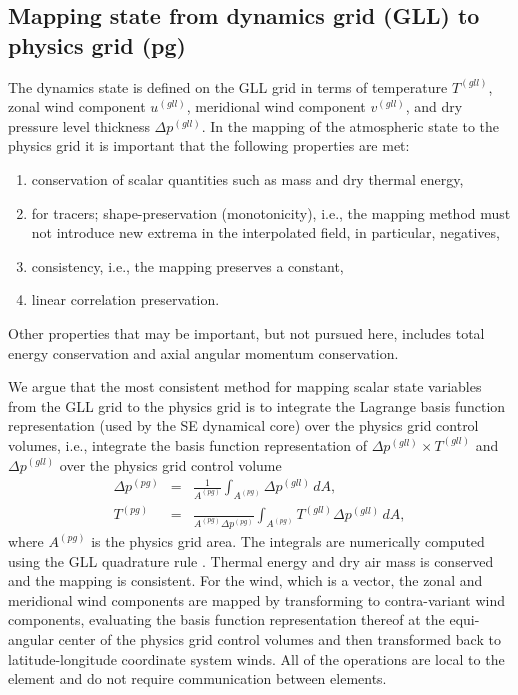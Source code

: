 \documentclass[twocol]{ametsoc}
\begin{document}
\subsection{Mapping state from dynamics grid (GLL) to physics grid (pg)}
The dynamics state is defined on the GLL grid in terms of temperature $T^{(gll)}$, zonal wind component $u^{(gll)}$, meridional wind component $v^{(gll)}$, and dry pressure level thickness $\Delta p^{(gll)}$. In the mapping of the atmospheric state to the physics grid it is important that the following properties are met:
\begin{enumerate}
\item conservation of scalar quantities such as mass and dry thermal energy,\label{prop1}
\item for tracers; shape-preservation (monotonicity), i.e., the mapping method must not introduce new extrema in the interpolated field, in particular, negatives,\label{prop2}
\item consistency, i.e., the mapping preserves a constant,\label{prop3}
\item linear correlation preservation.
\end{enumerate}
Other properties that may be important, but not pursued here, includes total energy conservation and axial angular momentum conservation{}. 

We argue that the most consistent method for mapping scalar state variables from the GLL grid to the physics grid is to integrate the Lagrange basis function representation (used by the SE dynamical core) over the physics grid control volumes, i.e., integrate the basis function representation of $\Delta p^{(gll)}\times T^{(gll)}$ and $\Delta p^{(gll)}$ over the physics grid control volume \citep[see, e.g., ][]{LTOUNGK2017MWR,UT2015MWR}
\begin{eqnarray}
\Delta p^{(pg)}&=&\frac{1}{A^{(pg)}}\int_{A^{(pg)}}\Delta p^{(gll)}\, dA,\\
T^{(pg)}&=&\frac{}{A^{(pg)}\Delta p^{(pg)}}\int_{A^{(pg)}}T^{(gll)}\Delta p^{(gll)}\, dA,
\end{eqnarray}
where $A^{(pg)}$ is the physics grid area. The integrals are numerically computed using the GLL quadrature rule {}. Thermal energy and dry air mass is conserved and the mapping is consistent. For the wind, which is a vector, the zonal and meridional wind components are mapped by transforming to contra-variant wind components, evaluating the basis function representation thereof at the equi-angular center of the physics grid control volumes and then transform{\color{red}ed{}} back to latitude-longitude coordinate system winds. All of the operations are local to the element and do not require communication between elements.
\end{document}
